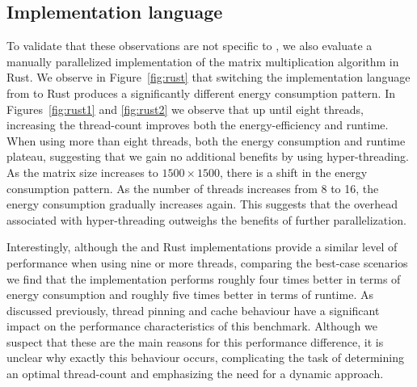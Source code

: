 \subsection{Implementation language}

To validate that these observations are not specific to \sac{}, we also evaluate a manually
parallelized implementation of the matrix multiplication algorithm in Rust. We observe in
Figure~\ref{fig:rust} that switching the implementation language from \sac{} to Rust produces a
significantly different energy consumption pattern. In Figures~\ref{fig:rust1} and \ref{fig:rust2}
we observe that up until eight threads, increasing the thread-count improves both the
energy-efficiency and runtime. When using more than eight threads, both the energy consumption and
runtime plateau, suggesting that we gain no additional benefits by using hyper-threading. As the
matrix size increases to $1500 \times 1500$, there is a shift in the energy consumption pattern. As
the number of threads increases from 8 to 16, the energy consumption gradually increases again. This
suggests that the overhead associated with hyper-threading outweighs the benefits of further
parallelization.

Interestingly, although the \sac{} and Rust implementations provide a similar level of performance
when using nine or more threads, comparing the best-case scenarios we find that the \sac{}
implementation performs roughly four times better in terms of energy consumption and roughly five
times better in terms of runtime. As discussed previously, thread pinning and cache behaviour have a
significant impact on the performance characteristics of this benchmark. Although we suspect that
these are the main reasons for this performance difference, it is unclear why exactly this behaviour
occurs, complicating the task of determining an optimal thread-count and emphasizing the need for a
dynamic approach.

